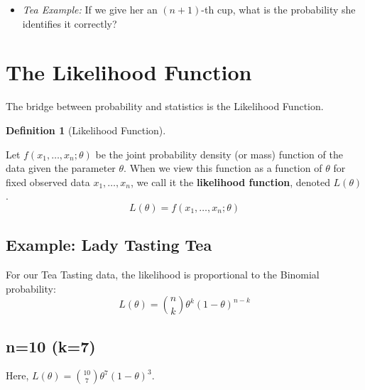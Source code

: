 \documentclass[
  letterpaper,
  DIV=11,
  numbers=noendperiod]{scrreprt}
\providecommand{\tightlist}{%
  \setlength{\itemsep}{0pt}\setlength{\parskip}{0pt}}
\renewcommand{\[}{\begin{equation}}
\renewcommand{\]}{\end{equation}}
\theoremstyle{definition}
\newtheorem{definition}{Definition}[chapter]
\theoremstyle{plain}
\theoremstyle{plain}
\theoremstyle{plain}
\theoremstyle{definition}
\theoremstyle{plain}
\theoremstyle{remark}
\begin{document}
\begin{itemize}
\tightlist
\item
  \emph{Tea Example:} If we give her an \((n+1)\)-th cup, what is the
  probability she identifies it correctly?
\end{itemize}

\section{The Likelihood Function}\label{the-likelihood-function}

The bridge between probability and statistics is the Likelihood
Function.

\begin{definition}[Likelihood
Function]\protect\hypertarget{def-likelihood}{}\label{def-likelihood}

Let \(f(x_1, \dots, x_n; \theta)\) be the joint probability density (or
mass) function of the data given the parameter \(\theta\). When we view
this function as a function of \(\theta\) for fixed observed data
\(x_1, \dots, x_n\), we call it the \textbf{likelihood function},
denoted \(L(\theta)\). \[L(\theta) = f(x_1, \dots, x_n; \theta)\]

\end{definition}

\subsection*{Example: Lady Tasting Tea}\label{example-lady-tasting-tea}

For our Tea Tasting data, the likelihood is proportional to the Binomial
probability: \[L(\theta) = \binom{n}{k} \theta^k (1-\theta)^{n-k}\]

\subsection{n=10 (k=7)}

Here, \(L(\theta) = \binom{10}{7} \theta^{7} (1-\theta)^{3}\).
\end{document}
